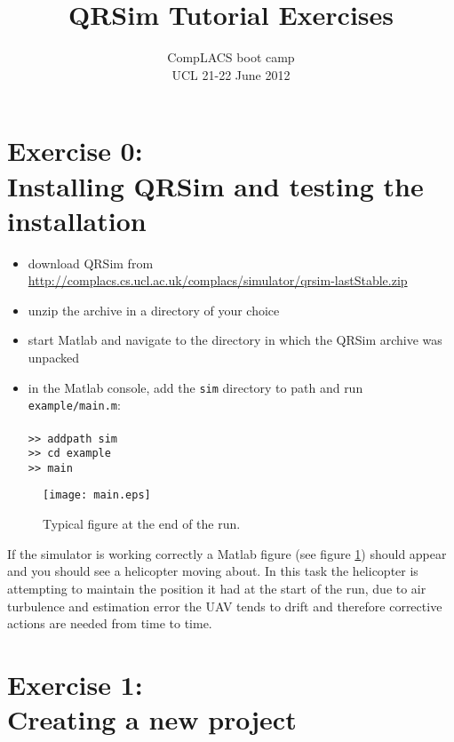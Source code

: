 \documentclass[a4paper,11pt]{article}
\title{QRSim Tutorial Exercises}
\author{{CompLACS} boot camp\\UCL 21-22 June 2012}
\date{}
\newcommand{\webrepo}{\url{http://complacs.cs.ucl.ac.uk/complacs/simulator/qrsim-lastStable.zip}\xspace}
\begin{document}
\maketitle
\section*{Exercise 0:\\Installing QRSim and testing the installation}

\begin{itemize}
 \item download QRSim from \\\webrepo
 \item unzip the archive in a directory of your choice
 \item start Matlab and navigate to the directory in which the QRSim archive was unpacked
 \item in the Matlab console, add the \texttt{sim} directory to path and run \texttt{example/main.m}:\\
  \texttt{\\
  >> addpath sim\\
  >> cd example\\
  >> main}
\end{itemize}
\begin{figure}[!b]
\texttt{[image: main.eps]}
 \caption{Typical figure at the end of the run.\label{fig:main}}
\end{figure}
If the simulator is working correctly a Matlab figure (see figure \ref{fig:main}) should appear and you should see a helicopter moving about. In this task the helicopter is attempting to maintain the position it had at the start of the run, due to air turbulence and estimation error the UAV tends to drift and therefore corrective actions are needed from time to time. 

\section*{Exercise 1:\\Creating a new project}
\end{document}
